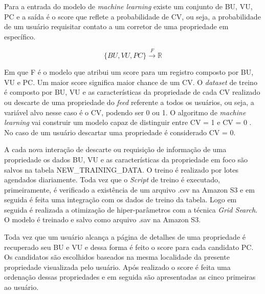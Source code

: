 Para a entrada do modelo de \textit{machine learning} existe um conjunto de {BU, VU, PC} e a saída é o score que reflete a probabilidade de CV, ou seja, a probabilidade de um usuário requisitar contato a um corretor de uma propriedade em específico.

\begin{equation}
    \{BU,VU,PC\}  \xrightarrow{F} \mathbb{R}
\end{equation}

Em que F é o modelo que atribui um score para um registro composto por BU, VU e PC. Um maior score significa maior chance de um CV. O \textit{dataset} de treino é composto por BU, VU e as características da propriedade de cada CV realizado ou descarte de uma propriedade do \textit{feed} referente a todos os usuários, ou seja, a variável alvo nesse caso é o CV, podendo ser 0 ou 1. O algoritmo de \textit{machine learning} vai construir um modelo capaz de distinguir entre CV = 1 e CV = 0 . No caso de um usuário descartar uma propriedade é considerado CV = 0.

A cada nova interação de descarte ou requisição de informação de uma propriedade os dados BU, VU e as características da propriedade em foco são salvos na tabela NEW\_TRAINING\_DATA. O treino é realizado por lotes agendados diariamente. Toda vez que o \textit{Script} de treino é executado, primeiramente, é verificado a existência de um arquivo .csv na Amazon S3 e em seguida é feita uma integração com os dados de treino da tabela. Logo em seguida é realizada a otimização de hiper-parâmetros com a técnica \textit{Grid Search}. O modelo é treinado e salvo como arquivo .sav na Amazon S3.

Toda vez que um usuário alcança a página de detalhes de uma propriedade é recuperado seu BU e VU e dessa forma é feito o score para cada candidato PC. Os candidatos são escolhidos baseados na mesma localidade da presente propriedade visualizada pelo usuário. Após realizado o score é feita uma ordenação dessas propriedades e em seguida são apresentadas as cinco primeiras ao usuário.

